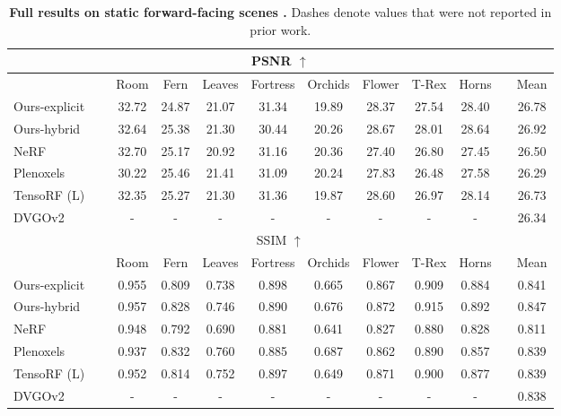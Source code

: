 \documentclass[10pt,twocolumn,letterpaper]{article}
\begin{document}
\renewcommand{\tabcolsep}{6pt}
\begin{table*}
  \centering
  \begin{tabular}{llcccccccclc}
    \multicolumn{12}{c}{PSNR $\uparrow$} \\
    \toprule
    && Room & Fern & Leaves & Fortress & Orchids & Flower & T-Rex & Horns && Mean \\ 
    \cmidrule(){1-1} \cmidrule(){3-10} \cmidrule(){12-12}
    Ours-explicit              && 32.72 & 24.87 & 21.07 & 31.34 & 19.89 & 28.37 & 27.54 & 28.40 && 26.78 \\
    Ours-hybrid                && 32.64 & 25.38 & 21.30 & 30.44 & 20.26 & 28.67 & 28.01 & 28.64 && 26.92 \\
    NeRF~\cite{nerf}           && 32.70 & 25.17 & 20.92 & 31.16 & 20.36 & 27.40 & 26.80 & 27.45 && 26.50 \\
    Plenoxels~\cite{plenoxels} && 30.22 & 25.46 & 21.41 & 31.09 & 20.24 & 27.83 & 26.48 & 27.58 && 26.29 \\
    TensoRF (L)~\cite{tensorf} && 32.35 & 25.27 & 21.30 & 31.36 & 19.87 & 28.60 & 26.97 & 28.14 && 26.73 \\
    DVGOv2~\cite{dvgo}         && -     & -     & -     & -     & -     & -     & -     & -     && 26.34 \\
    \bottomrule
    
    \multicolumn{12}{c}{SSIM $\uparrow$} \\
    \toprule
    && Room & Fern & Leaves & Fortress & Orchids & Flower & T-Rex & Horns && Mean \\ 
    \cmidrule(){1-1} \cmidrule(){3-10} \cmidrule(){12-12}
    Ours-explicit              && 0.955 & 0.809 & 0.738 & 0.898 & 0.665 & 0.867 & 0.909 & 0.884 && 0.841 \\
    Ours-hybrid                && 0.957 & 0.828 & 0.746 & 0.890 & 0.676 & 0.872 & 0.915 & 0.892 && 0.847 \\
    NeRF~\cite{nerf}           && 0.948 & 0.792 & 0.690 & 0.881 & 0.641 & 0.827 & 0.880 & 0.828 && 0.811 \\
    Plenoxels~\cite{plenoxels} && 0.937 & 0.832 & 0.760 & 0.885 & 0.687 & 0.862 & 0.890 & 0.857 && 0.839 \\
    TensoRF (L)~\cite{tensorf} && 0.952 & 0.814 & 0.752 & 0.897 & 0.649 & 0.871 & 0.900 & 0.877 && 0.839 \\
    DVGOv2~\cite{dvgo}         && -     & -     & -     & -     & -     & -     & -     & -     && 0.838 \\
    \bottomrule
  \end{tabular}
  \caption{\textbf{Full results on static forward-facing scenes \cite{llff}.} Dashes denote values that were not reported in prior work.}
  \label{tab:full_llff}
\end{table*}
\end{document}
